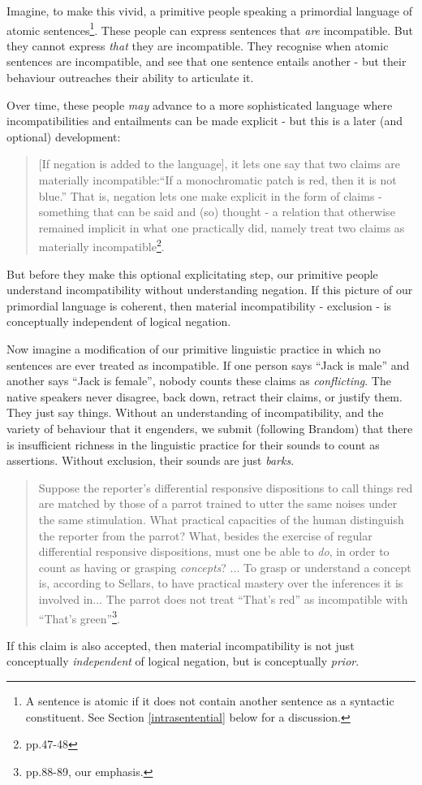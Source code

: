 Imagine, to make this vivid, a primitive people speaking a
primordial language of atomic sentences\footnote{A sentence is atomic if it does not contain another sentence as a syntactic constituent. See Section \ref{intrasentential} below for a discussion.}. These people can express
sentences that \emph{are} incompatible.  But they cannot express
\emph{that} they are incompatible.  They
recognise when atomic sentences are incompatible, and see that one
sentence entails another - but their behaviour outreaches their ability
to articulate it.  

Over time, these people \emph{may} advance to a more
sophisticated language where incompatibilities and entailments can be
made explicit - but this is a later (and optional) development:
\begin{quote}
[If negation is added to the language], it lets one say that two claims are materially incompatible:``If a monochromatic patch is red, then it is not blue.'' That is, negation lets one make explicit in the form of claims - something that can be said and (so) thought - a relation that otherwise remained implicit in what one practically did, namely treat two claims as materially incompatible\footnote{\cite{brandom} pp.47-48}.
\end{quote}
But before they make this optional explicitating step, our primitive people understand incompatibility without understanding negation.
If this picture of our primordial language is coherent, then material incompatibility - exclusion - is conceptually independent of logical negation.

Now imagine a modification of our primitive linguistic practice in which no
sentences are ever treated as incompatible.  If one person says ``Jack
is male'' and another says ``Jack is female'', nobody counts these
claims as \emph{conflicting}.  The native speakers never disagree,
back down, retract their claims, or justify them. They just say things.
Without an understanding of incompatibility, and the variety of behaviour that it
engenders, we submit (following Brandom) that there is insufficient
richness in the linguistic practice for their sounds to count as
assertions.  Without exclusion, their sounds are just \emph{barks}.
\begin{quote}
Suppose the reporter's differential responsive dispositions to call things red are matched by those of a parrot trained to utter the same noises under the same stimulation. What practical capacities of the human distinguish the reporter from the parrot? What, besides the exercise of regular differential responsive dispositions, must one be able to \emph{do}, in order to count as having or grasping \emph{concepts}? ... To grasp or understand a concept is, according to Sellars, to have practical mastery over the inferences it is involved in... The parrot does not treat ``That's red'' as incompatible with ``That's green''\footnote{\cite{brandom2} pp.88-89, our emphasis.}.
\end{quote}
If this  claim is also accepted, then material incompatibility
is not just conceptually \emph{independent} of logical
negation, but is conceptually \emph{prior}.

